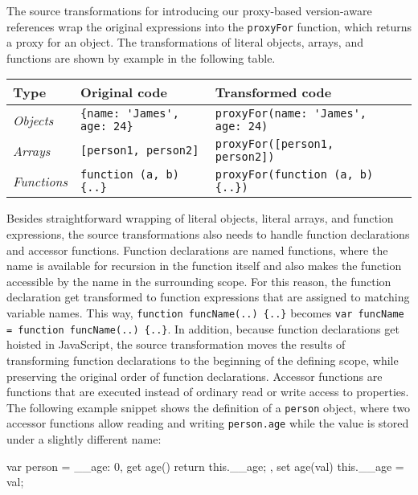 The source transformations for introducing our proxy-based version-aware references wrap the original expressions into the \lstinline{proxyFor} function, which returns a proxy for an object.
The transformations of literal objects, arrays, and functions are shown by example in the following table.

\begin{center}
    \begin{tabular}{| l | l | l | l |}
    \hline
    Type & Original code & Transformed code \\ \hline
    \emph{Objects} & \lstinline|{name: 'James', age: 24}| & \lstinline|proxyFor(name: 'James', age: 24)| \\ \hline
    \emph{Arrays} & \lstinline|[person1, person2]| & \lstinline|proxyFor([person1, person2])| \\ \hline
    \emph{Functions} & \lstinline|function (a, b) {..}| & \lstinline|proxyFor(function (a, b) {..})| \\ \hline
    \end{tabular}
\end{center}

Besides straightforward wrapping of literal objects, literal arrays, and function expressions, the source transformations also needs to handle function declarations and accessor functions.
Function declarations are named functions, where the name is available for recursion in the function itself and also makes the function accessible by the name in the surrounding scope.
For this reason, the function declaration get transformed to function expressions that are assigned to matching variable names.
This way, \lstinline|function funcName(..) {..}| becomes \lstinline|var funcName = function funcName(..) {..}|.
In addition, because function declarations get hoisted in JavaScript, the source transformation moves the results of transforming function declarations to the beginning of the defining scope, while preserving the original order of function declarations.
Accessor functions are functions that are executed instead of ordinary read or write access to properties.
The following example snippet shows the definition of a \lstinline{person} object, where two accessor functions allow reading and writing \lstinline{person.age} while the value is stored under a slightly different name: \\
\iffalse
\begin{verbatim}\fi
\begin{code}{}{}
var person = {
    __age: 0,
    get age() {
        return this.__age;
    },
    set age(val) {
        this.__age = val;
    }
}
\end{code}
\iffalse
\end{verbatim}\fi

